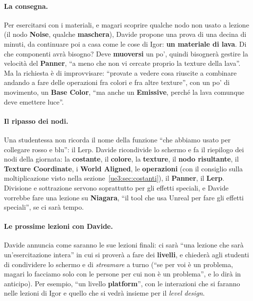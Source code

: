 \paragraph{La consegna.} Per esercitarsi con i materiali, e magari scoprire qualche nodo
non usato a lezione (il nodo \textbf{Noise}, qualche \textbf{maschera}), Davide propone
una prova di una decina di minuti, da continuare poi a casa come le cose di Igor:
\textbf{un materiale di lava}. Di che componenti avrà bisogno? Deve \textbf{muoversi}
un po', quindi bisognerà gestire la velocità del \textbf{Panner}, ``a meno che non vi
cercate proprio la texture della lava''. Ma la richiesta è di improvvisare: ``provate a
vedere cosa riuscite a combinare andando a fare delle operazioni fra colori e fra altre
texture'', con un po' di movimento, un \textbf{Base Color}, ``ma anche un
\textbf{Emissive}, perché la lava comunque deve emettere luce''.

\paragraph{Il ripasso dei nodi.} Una studentessa non ricorda il nome della funzione
``che abbiamo usato per collegare rosso e blu'': il Lerp. Davide ricondivide lo schermo
e fa il riepilogo dei nodi della giornata: la \textbf{costante}, il \textbf{colore}, la
\textbf{texture}, il \textbf{nodo risultante}, il \textbf{Texture Coordinate}, i
\textbf{World Aligned}, le \textbf{operazioni} (con il consiglio sulla moltiplicazione
visto nella sezione~\ref{ue3:sec:costanti}), il \textbf{Panner}, il \textbf{Lerp}.
Divisione e sottrazione servono soprattutto per gli effetti speciali, e Davide vorrebbe
fare una lezione su \textbf{Niagara}, ``il tool che usa Unreal per fare gli effetti
speciali'', se ci sarà tempo.

\paragraph{Le prossime lezioni con Davide.} Davide annuncia come saranno le sue
lezioni finali: ci sarà ``una lezione che sarà un'esercitazione intera'' in cui si
proverà a fare dei \textbf{livelli}, e chiederà agli studenti di condividere lo schermo
e di \emph{streamare} a turno (``se per voi è un problema, magari lo facciamo solo con le
persone per cui non è un problema'', e lo dirà in anticipo). Per esempio, ``un livello
\textbf{platform}'', con le interazioni che si faranno nelle lezioni di Igor e quello che
si vedrà insieme per il \emph{level design}.

